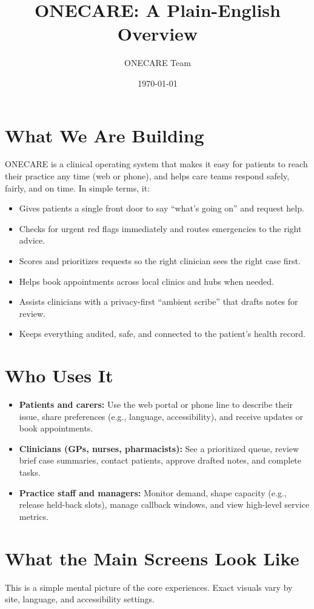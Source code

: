 \documentclass[11pt]{article}
\title{ONECARE: A Plain-English Overview}
\author{ONECARE Team}
\date{\today}
\begin{document}
\maketitle

\section*{What We Are Building}
ONECARE is a clinical operating system that makes it easy for patients to reach their practice any time (web or phone), and helps care teams respond safely, fairly, and on time. In simple terms, it:
\begin{itemize}
  \item Gives patients a single front door to say ``what's going on'' and request help.
  \item Checks for urgent red flags immediately and routes emergencies to the right advice.
  \item Scores and prioritizes requests so the right clinician sees the right case first.
  \item Helps book appointments across local clinics and hubs when needed.
  \item Assists clinicians with a privacy-first ``ambient scribe'' that drafts notes for review.
  \item Keeps everything audited, safe, and connected to the patient's health record.
\end{itemize}

\section*{Who Uses It}
\begin{itemize}
  \item \textbf{Patients and carers:} Use the web portal or phone line to describe their issue, share preferences (e.g., language, accessibility), and receive updates or book appointments.
  \item \textbf{Clinicians (GPs, nurses, pharmacists):} See a prioritized queue, review brief case summaries, contact patients, approve drafted notes, and complete tasks.
  \item \textbf{Practice staff and managers:} Monitor demand, shape capacity (e.g., release held-back slots), manage callback windows, and view high-level service metrics.
\end{itemize}

\section*{What the Main Screens Look Like}
This is a simple mental picture of the core experiences. Exact visuals vary by site, language, and accessibility settings.
\end{document}

